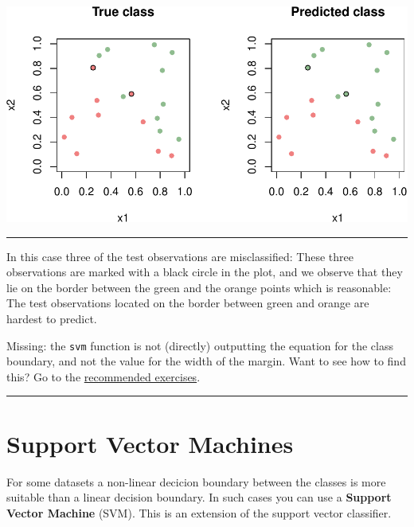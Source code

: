 \documentclass[]{article}
\begin{document}
\includegraphics{9SVM_files/figure-latex/unnamed-chunk-18-1.pdf}

\normalsize

\begin{center}\rule{0.5\linewidth}{\linethickness}\end{center}

In this case three of the test observations are misclassified: These
three observations are marked with a black circle in the plot, and we
observe that they lie on the border between the green and the orange
points which is reasonable: The test observations located on the border
between green and orange are hardest to predict.

Missing: the \texttt{svm} function is not (directly) outputting the
equation for the class boundary, and not the value for the width of the
margin. Want to see how to find this? Go to the
\protect\hyperlink{recex}{recommended exercises}.

\begin{center}\rule{0.5\linewidth}{\linethickness}\end{center}

\hypertarget{support-vector-machines}{%
\section{Support Vector Machines}\label{support-vector-machines}}

For some datasets a non-linear decicion boundary between the classes is
more suitable than a linear decision boundary. In such cases you can use
a \textbf{Support Vector Machine} (SVM). This is an extension of the
support vector classifier.
\end{document}
